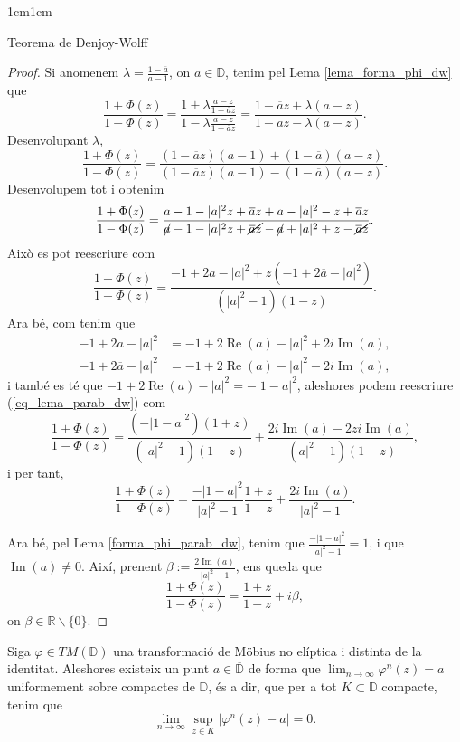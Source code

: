 \begin{adjustwidth}{1cm}{1cm}
\begin{subsection}{Teorema de Denjoy-Wolff}
    \begin{proof}
        Si anomenem $\lambda=\frac{1-\overline{a}}{a-1}$, on $a\in \mathbb{D}$, tenim pel Lema \ref{lema_forma_phi_dw} que 
        \[
            \frac{1+\Phi(z)}{1-\Phi(z)}=\frac{1+\lambda \frac{a-z}{1-\overline{a}z}}{1-\lambda \frac{a-z}{1-\overline{a}z}}=\frac{1-\overline{a}z+\lambda(a-z)}{1-\overline{a}z-\lambda(a-z)}.
        \]
        Desenvolupant $\lambda$,
        \[
            \frac{1+\Phi(z)}{1-\Phi(z)}=\frac{(1-\overline{a}z)(a-1)+(1-\overline{a})(a-z)}{(1-\overline{a}z)(a-1)-(1-\overline{a})(a-z)}.
        \]
        Desenvolupem tot i obtenim
        \[
            \frac{1+\Phi(z)}{1-\Phi(z)}=\frac{a-1-|a|^2z+\overline{a}z+a-|a|^2-z+\overline{a}z}{\cancel{a}-1-|a|^2z+\cancel{\overline{a}z}-\cancel{a}+|a|^2+z-\cancel{\overline{a}z}}.
        \]
        Això es pot reescriure com 
        \begin{equation}
            \frac{1+\Phi(z)}{1-\Phi(z)}=\frac{-1+2a-|a|^2+z(-1+2\overline{a}-|a|^2)}{(|a|^2-1)(1-z)}.
            \label{eq_lema_parab_dw}
        \end{equation}
        Ara bé, com tenim que
        \begin{equation*}
            \begin{aligned}
                -1+2a-|a|^2 &=-1+2\operatorname{Re}(a)-|a|^2+2i\operatorname{Im}(a), \\
                -1+2\overline{a}-|a|^2 &=-1+2\operatorname{Re}(a)-|a|^2-2i\operatorname{Im}(a),
            \end{aligned}
        \end{equation*}
        i també es té que $-1+2\operatorname{Re}(a)-|a|^2=-|1-a|^2$, aleshores podem reescriure (\ref{eq_lema_parab_dw}) com 
        \[
            \frac{1+\Phi(z)}{1-\Phi(z)}=\frac{(-|1-a|^2)(1+z)}{(|a|^2-1)(1-z)}+\frac{2i\operatorname{Im}(a)-2zi\operatorname{Im}(a)}{|(a|^2-1)(1-z)},
        \]
        i per tant,
        \[
            \frac{1+\Phi(z)}{1-\Phi(z)}=\frac{-|1-a|^2}{|a|^2-1}\frac{1+z}{1-z}+\frac{2i\operatorname{Im}(a)}{|a|^2-1}.
        \]

        Ara bé, pel Lema \ref{forma_phi_parab_dw}, tenim que $\frac{-|1-a|^2}{|a|^2-1}=1$, i que $\operatorname{Im}(a)\neq 0$. Així, prenent $\beta:=\frac{2\operatorname{Im}(a)}{|a|^2-1}$, ens queda que 
        \[
            \frac{1+\Phi(z)}{1-\Phi(z)}=\frac{1+z}{1-z}+i\beta,
        \]
        on $\beta\in \mathbb{R}\backslash\{0\}$.
    \end{proof}

    \begin{teorema}
        Siga $\varphi\in TM(\mathbb{D})$ una transformació de Möbius no elíptica i distinta de la identitat. Aleshores existeix un punt $a\in\overline{\mathbb{D}}$ de forma que $\displaystyle\lim_{n\to\infty}\varphi^n(z)=a$ uniformement sobre compactes de $\mathbb{D}$, és a dir, que per a tot $K\subset \mathbb{D}$ compacte, tenim que
        \[
            \lim_{n\to \infty}\sup_{z\in K}|\varphi^n(z)-a|=0.
        \]
        

\end{teorema}
\end{subsection}
\end{adjustwidth}
